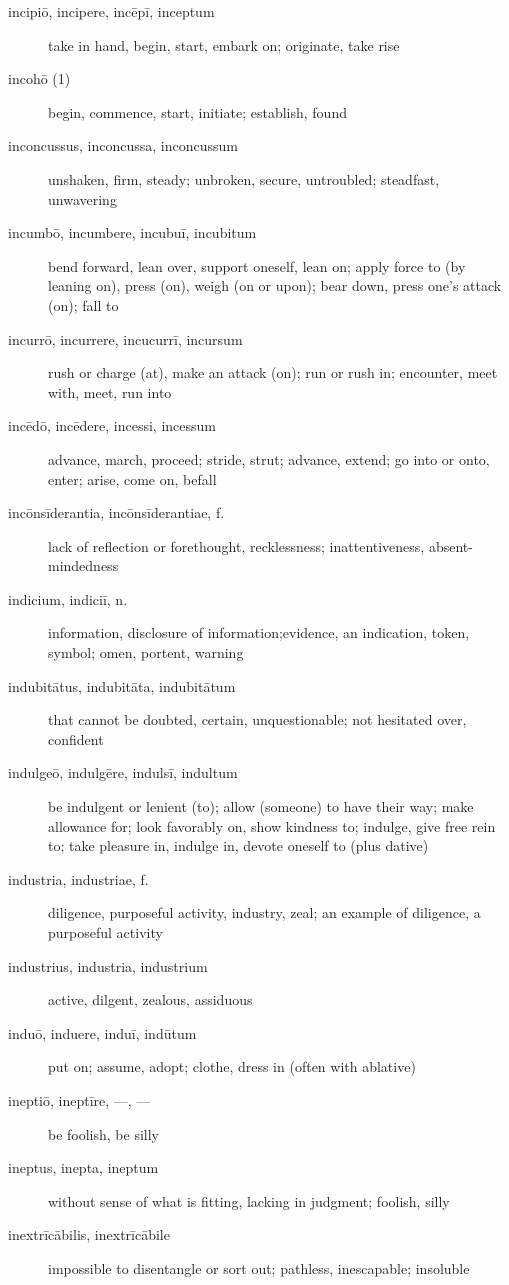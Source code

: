 \begin{description}
    \item[incipiō, incipere, incēpī, inceptum] take in hand, begin, start, embark on; originate, take rise
    \item[incohō (1)] begin, commence, start, initiate; establish, found
    \item[inconcussus, inconcussa, inconcussum] unshaken, firm, steady; unbroken, secure, untroubled; steadfast, unwavering
    \item[incumbō, incumbere, incubuī, incubitum] bend forward, lean over, support oneself, lean on; apply force to (by leaning on), press (on), weigh (on or upon); bear down, press one's attack (on); fall to
    \item[incurrō, incurrere, incucurrī, incursum] rush or charge (at), make an attack (on); run or rush in; encounter, meet with, meet, run into
    \item[incēdō, incēdere, incessi, incessum] advance, march, proceed; stride, strut; advance, extend; go into or onto, enter; arise, come on, befall
    \item[incōnsīderantia, incōnsīderantiae, f.] lack of reflection or forethought, recklessness; inattentiveness, absent-mindedness
    \item[indicium, indiciī, n.] information, disclosure of information;evidence, an indication, token, symbol; omen, portent, warning
    \item[indubitātus, indubitāta, indubitātum] that cannot be doubted, certain, unquestionable; not hesitated over, confident
    \item[indulgeō, indulgēre, indulsī, indultum] be indulgent or lenient (to); allow (someone) to have their way; make allowance for; look favorably on, show kindness to; indulge, give free rein to; take pleasure in, indulge in, devote oneself to (plus dative)
    \item[industria, industriae, f.] diligence, purposeful activity, industry, zeal; an example of diligence, a purposeful activity
    \item[industrius, industria, industrium] active, dilgent, zealous, assiduous
    \item[induō, induere, induī, indūtum] put on; assume, adopt; clothe, dress in (often with ablative)
    \item[ineptiō, ineptīre, ---, ---] be foolish, be silly
    \item[ineptus, inepta, ineptum] without sense of what is fitting, lacking in judgment; foolish, silly
    \item[inextrīcābilis, inextrīcābile] impossible to disentangle or sort out; pathless, inescapable; insoluble

\end{description}
